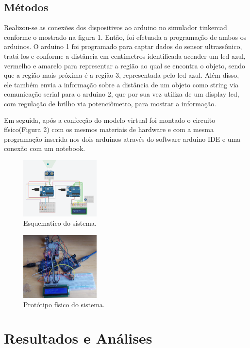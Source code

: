 \documentclass[conference]{IEEEtran}
\begin{document}
\subsection{Métodos}

Realizou-se as conexões dos dispositivos ao arduino no simulador tinkercad conforme o mostrado na figura 1.
Então, foi efetuada a programação de ambos os arduinos. O arduino 1 foi programado para captar dados do sensor ultrassônico, tratá-los
e conforme a distância em centímetros identificada acender um led azul, vermelho e amarelo para representar a região ao qual se encontra o objeto, sendo que a região mais próxima é a região 3, representada pelo led azul.
Além disso, ele também envia a informação sobre a distância de um objeto como string via comunicação serial para o arduino 2, que por sua vez utiliza de um display lcd, com regulação de brilho via potenciômetro, para mostrar a informação.

Em seguida, após a confecção do modelo virtual foi montado o circuito físico(Figura 2) com os mesmos materiais de hardware e com a mesma programação inserida nos dois arduinos através do software arduino IDE e uma conexão com um notebook.


\begin{figure}[htbp]
    \centerline{
        \includegraphics[width=4cm]{images/esquema-arduino.png}
    }
    \caption{Esquematico do sistema.}
    \label{fig}
\end{figure}

\begin{figure}[htbp]
    \centerline{
        \includegraphics[width=4cm]{images/esquema-arduino-fisico.png}
    }
    \caption{Protótipo físico do sistema.}
    \label{fig}
\end{figure}

\section{Resultados e Análises}
\end{document}

